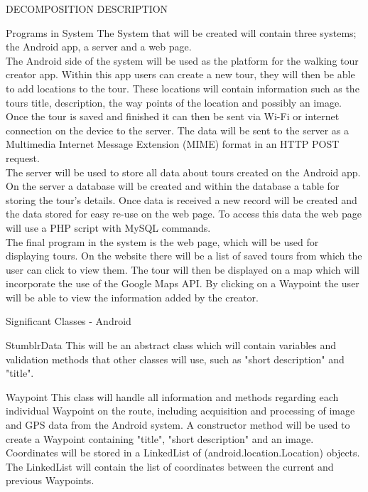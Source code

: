 \documentclass{article}
\begin{document}
	\begin{section}{DECOMPOSITION DESCRIPTION}
		\begin{subsection}{Programs in System}
		The System that will be created will contain three systems; the Android app, a server and a web page. \\

		The Android side of the system will be used as the platform for the walking tour creator app. Within this app users can create a new tour, they will then be able to add locations to the tour. These locations will contain information such as the tours title, description, the way points of the location and possibly an image. Once the tour is saved and finished it can then be sent via Wi-Fi or internet connection on the device to the server. The data will be sent to the server as a Multimedia Internet Message Extension (MIME) format in an HTTP POST request.\\

		The server will be used to store all data about tours created on the Android app. On the server a database will be created and within the database a table for storing the tour's details. Once data is received a new record will be created and the data stored for easy re-use on the web page. To access this data the web page will use a PHP script with MySQL commands.\\

		The final program in the system is the web page, which will be used for displaying tours. On the website there will be a list of saved tours from which the user can click to view them. The tour will then be displayed on a map which will incorporate the use of the Google Maps API. By clicking on a Waypoint the user will be able to view the information added by the creator.
		\end{subsection}


	    \clearpage
	    \begin{subsection}{Significant Classes - Android}
		    \begin{subsubsection}{StumblrData}
		    This will be an abstract class which will contain variables and validation methods that other classes will use, such as "short description" and "title".
		    \end{subsubsection}

		    \begin{subsubsection}{Waypoint}
		    This class will handle all information and methods regarding each individual Waypoint on the route, including acquisition and processing of image and GPS data from the Android system. A constructor method will be used to create a Waypoint containing "title", "short description" and an image. Coordinates will be stored in a LinkedList of (android.location.Location) objects. The LinkedList will contain the list of coordinates between the current and previous Waypoints.
		    \end{subsubsection}


\end{subsection}
\end{section}
\end{document}
